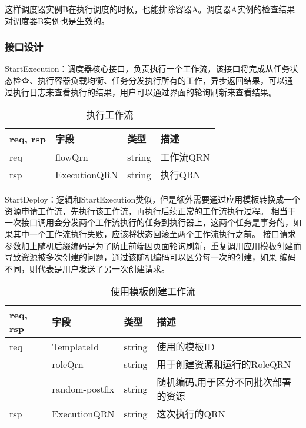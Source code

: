 这样调度器实例B在执行调度的时候，也能排除容器A。调度器A实例的检查结果对调度器B实例也是生效的。


\subsubsection{接口设计}

StartExecution：调度器核心接口，负责执行一个工作流，该接口将完成从任务状态检查、执行容器负载均衡、任务分发执行所有的工作，异步返回结果，可以通
过执行日志来查看执行的结果，用户可以通过界面的轮询刷新来查看结果。
\begin{table}[H]
    \centering
    \caption{执行工作流}
    \label{tab:design-interface-start-execution}
    \begin{tabular}{llll}
        \toprule
        req, rsp   & 字段 & 类型 & 描述 \\
        \midrule
        req & flowQrn & string & 工作流QRN\\
        rsp & ExecutionQRN & string & 执行QRN\\
        \bottomrule
    \end{tabular}
\end{table}

StartDeploy：逻辑和StartExecution类似，但是额外需要通过应用模板转换成一个资源申请工作流，先执行该工作流，再执行后续正常的工作流执行过程。
相当于一次接口调用会分发两个工作流执行的任务到执行器上，这两个任务是事务的，如果其中一个工作流执行失败，应该将状态回滚至两个工作流执行之前。
接口请求参数加上随机后缀编码是为了防止前端因页面轮询刷新，重复调用应用模板创建而导致资源被多次创建的问题，通过该随机编码可以区分每一次的创建，如果
编码不同，则代表是用户发送了另一次创建请求。
    \begin{table}[H]
        \centering
        \caption{使用模板创建工作流}
        \label{tab:design-interface-start-deploy}
        \begin{tabular}{llll}
            \toprule
            req, rsp   & 字段 & 类型 & 描述 \\
            \midrule
            req & TemplateId & string & 使用的模板ID\\
            & roleQrn & string & 用于创建资源和运行的RoleQRN\\
            & random-postfix & string & 随机编码,用于区分不同批次部署的资源\\ \hline
            rsp & ExecutionQRN & string & 这次执行的QRN\\
            \bottomrule
        \end{tabular}
    \end{table}

